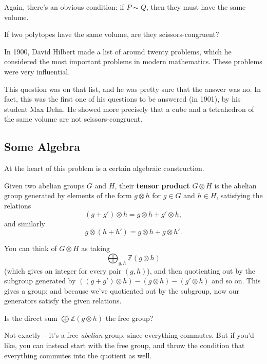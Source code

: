 Again, there's an obvious condition: if $P \sim Q$, then they must have the same volume. 

\begin{qq}
    If two polytopes have the same volume, are they scissors-congruent?
\end{qq}

In 1900, David Hilbert made a list of around twenty problems, which he considered the most important problems in modern mathematics. These problems were very influential.

This question was on that list, and he was pretty sure that the answer was no. In fact, this was the first one of his questions to be answered (in 1901), by his student Max Dehn. He showed more precisely that a cube and a tetrahedron of the same volume are not scissors-congruent. 

\subsection{Some Algebra}

At the heart of this problem is a certain algebraic construction. 

\begin{definition}
    Given two abelian groups $G$ and $H$, their \textbf{tensor product} $G \otimes H$ is the abelian group generated by elements of the form $g \otimes h$ for $g \in G$ and $h \in H$, satisfying the relations \[(g + g') \otimes h = g \otimes h + g' \otimes h,\] and similarly \[g \otimes (h + h') = g \otimes h + g \otimes h'.\] 
\end{definition}

You can think of $G \otimes H$ as taking \[\bigoplus_{g, h} \mathbb{Z}(g \otimes h)\] (which gives an integer for every pair $(g, h)$), and then quotienting out by the subgroup generated by $((g + g') \otimes h) - (g\otimes h) - (g' \otimes h)$ and so on. This gives a group; and because we've quotiented out by the subgroup, now our generators satisfy the given relations. 

\begin{question}
Is the direct sum $\bigoplus \mathbb{Z}(g \otimes h)$ the free group?
\end{question}

\begin{ans}
Not exactly -- it's a free \emph{abelian} group, since everything commutes. But if you'd like, you can instead start with the free group, and throw the condition that everything commutes into the quotient as well. 
\end{ans}

